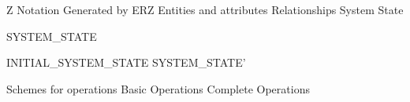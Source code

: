 
Z Notation
Generated by ERZ
Entities and attributes
Relationships
System State
\begin{schema}{SYSTEM\_STATE}

\end{schema}
\begin{schema}{INITIAL\_SYSTEM\_STATE}
SYSTEM\_STATE'
\where

\end{schema}
Schemes for operations
Basic Operations
Complete Operations
